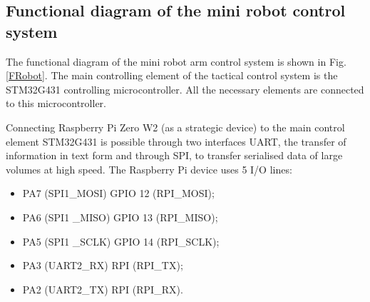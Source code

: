 \subsection{Functional diagram of the mini robot control system}
The functional diagram of the mini robot arm control system is shown in Fig. \ref{FRobot}.
The main controlling element of the tactical control system is the STM32G431 controlling microcontroller. All the necessary elements are connected to this microcontroller.

Connecting Raspberry Pi Zero W2 (as a strategic device) to the main control element STM32G431 is possible through two interfaces UART, the transfer of information in text form and through SPI, to transfer serialised data of large volumes at high speed. The Raspberry Pi device uses 5 I/O lines:
\begin{itemize}
	\item PA7 (SPI1\_MOSI) \rightarrow GPIO 12 (RPI\_MOSI);
	\item PA6 (SPI1 \_MISO) \rightarrow GPIO 13 (RPI\_MISO);
	\item PA5 (SPI1 \_SCLK) \rightarrow GPIO 14 (RPI\_SCLK);
	\item PA3 (UART2\_RX) \rightarrow RPI (RPI\_TX);
	\item PA2 (UART2\_TX) \rightarrow RPI (RPI\_RX).
\end{itemize}

